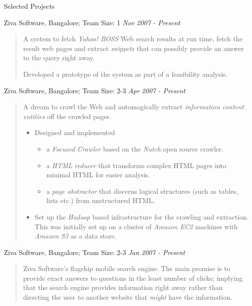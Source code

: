 \documentclass{resume}
\newcommand{\period}{\hfill\small\sl}
\newcommand{\teamsize}{\sc\footnotesize Team Size: }
\begin{document}
\begin{category}{Selected Projects}

     Ziva Software, Bangalore;
    {\teamsize 1}
    {\period Nov 2007 - Present}
    \begin{quotation}
        A system to fetch {\em Yahoo! BOSS} Web search results at run time,
        fetch the result web pages and extract {\em snippets} that can possibly
        provide an answer to the query right away.

        Developed a prototype of the system as part of a feasibility analysis.
    \end{quotation}

     Ziva Software, Bangalore;
    {\teamsize 2-3}
    {\period Apr 2007 - Present}
    \begin{quotation}
        A dream to crawl the Web and automagically extract {\em information
        content entities} off the crawled pages.

        \begin{itemize}
            \item Designed and implemented
                \begin{itemize}
                    \item a {\em Focused Crawler} based on the {\em Nutch} open
                        source crawler.
                    \item a {\em HTML reducer} that transforms complex HTML
                        pages into minimal HTML for easier analysis.
                    \item a {\em page abstractor} that discerns logical
                        structures (such as tables, lists etc.) from
                        unstructured HTML.
                \end{itemize}
            \item Set up the {\em Hadoop} based infrastructure for the crawling
                and extraction.  This was initially set up on a cluster of {\em
                Amazon EC2} machines with {\em Amazon S3} as a data store.
        \end{itemize}
    \end{quotation}

     Ziva Software, Bangalore;
    {\teamsize 2-3}
    {\period Jan 2007 - Present}
    \begin{quotation}
        Ziva Software's flagship mobile search engine.  The main promise is to
        provide exact answers to questions in the least number of clicks;
        implying that the search engine provides information right away rather
        than directing the user to another website that {\em might} have the
        information.


\end{quotation}
\end{category}
\end{document}
